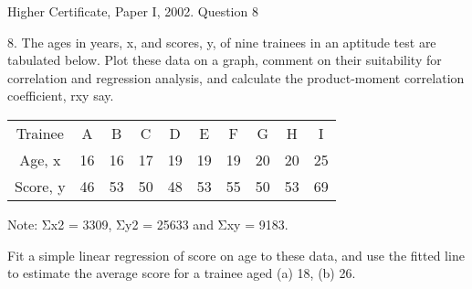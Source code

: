 \documentclass[a4paper,12pt]{article}
\begin{document}
Higher Certificate, Paper I, 2002. Question 8

\begin{framed}
8. The ages in years, x, and scores, y, of nine trainees in an aptitude test are tabulated
below. Plot these data on a graph, comment on their suitability for correlation and
regression analysis, and calculate the product-moment correlation coefficient, rxy
say.
\begin{center}
\begin{tabular}{|c|c|c|c|c|c|c|c|c|c|}
Trainee & A & B & C & D & E & F & G & H & I\\
Age, x & 16 & 16 & 17 & 19 & 19 & 19 & 20 & 20 & 25 \\
Score, y & 46 & 53 & 50 & 48 & 53 & 55 & 50 & 53 & 69  \\
\end{tabular}
\end{center}

Note: Σx2 = 3309, Σy2 = 25633 and Σxy = 9183.

Fit a simple linear regression of score on age to these data, and use the fitted line
to estimate the average score for a trainee aged
(a) 18,
(b) 26.


\end{framed}
\end{document}
